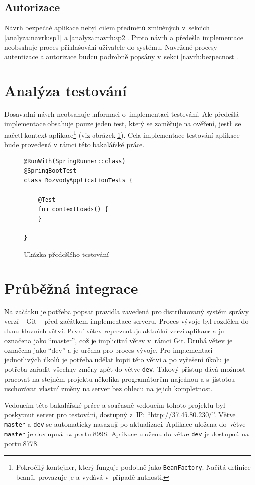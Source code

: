     \subsection{Autorizace}
        Návrh bezpečné aplikace nebyl cílem předmětů zmíněných v~sekcích \ref{analyza:navrh:sp1} a \ref{analyza:navrh:sp2}. Proto návrh a předešla implementace neobsahuje proces přihlašování uživatele do systému. Navržené procesy autentizace a autorizace budou podrobně popsány v~sekci \ref{navrh:bezpecnost}.
        
\section{Analýza testování}\label{analyza:testovani}
    Dosavadní návrh neobsahuje informaci o~implementaci testování. Ale předešlá implementace obsahuje pouze jeden test, který se zaměřuje na ověření, jestli se načetl {kontext aplikace}\footnote{Pokročilý kontejner, který funguje podobně jako \texttt{BeanFactory}. Načítá definice beanů, provazuje je a vydává v~případě nutnosti.} (viz obrázek \ref{code:test-context-loads1}). Cela implementace testování aplikace bude provedená v rámci této bakalářské práce.
    \begin{figure}
    \begin{verbatim}
@RunWith(SpringRunner::class)
@SpringBootTest
class RozvodyApplicationTests {

    @Test
    fun contextLoads() {
    }

}
        \end{verbatim}
        \caption{Ukázka předešlého testování} 
        \label{code:test-context-loads1}
        \end{figure}
        
\section{Průběžná integrace}\label{analyza:ci}
    Na začátku je potřeba popsat pravidla zavedená pro distribuovaný systém správy verzí -- Git -- před začátkem implementace serveru. Proces vývoje byl rozdělen do dvou hlavních větví. První větev reprezentuje aktuální verzi aplikace a je označena jako \enquote{master}, což je implicitní větev v~rámci Git. Druhá větev je označena jako \enquote{dev} a je určena pro proces vývoje. Pro implementaci jednotlivých úkolů je potřeba udělat kopii této větvi a po vyřešení úkolu je potřeba zařadit všechny změny zpět do větve \verb|dev|. Takový přístup dává možnost pracovat na stejném projektu několika programátorům najednou a s~jistotou uschovávat vlastní změny na server bez ohledu na jejich kompletnost.
    
    Vedoucím této bakalářské práce a současně vedoucím tohoto projektu byl poskytnut server pro testování, dostupný z~IP: \enquote{http://37.46.80.230/}. Větve \verb|master| a \verb|dev| se automaticky nasazují po aktualizaci. Aplikace uložena do~větve \verb|master| je dostupná na portu 8998. Aplikace uložena do větve \verb|dev| je dostupná na portu 8778.